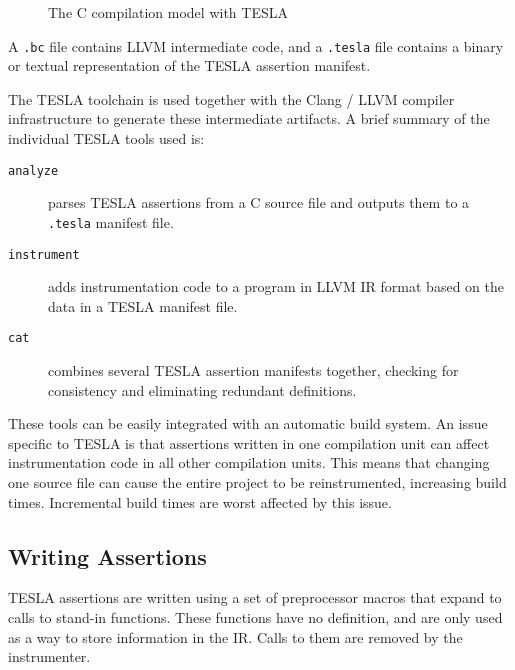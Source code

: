 {\begin{figure}[h]
{
  }
  \caption{The C compilation model with TESLA}
  \label{fig:c-tesla-compilation}
\end{figure}
}

A \texttt{.bc} file contains LLVM intermediate code, and a \texttt{.tesla} file
contains a binary or textual representation of the TESLA assertion manifest.

The TESLA toolchain is used together with the Clang / LLVM compiler
infrastructure to generate these intermediate artifacts. A brief summary of the
individual TESLA tools used is:

\begin{description}
  \item[\texttt{analyze}] parses TESLA assertions from a C source file and
    outputs them to a \texttt{.tesla} manifest file.
  \item[\texttt{instrument}] adds instrumentation code to a program in LLVM IR
    format based on the data in a TESLA manifest file.
  \item[\texttt{cat}] combines several TESLA assertion manifests together,
    checking for consistency and eliminating redundant definitions.
\end{description}

These tools can be easily integrated with an automatic build system. An issue
specific to TESLA is that assertions written in one compilation unit can affect
instrumentation code in all other compilation units. This means that changing
one source file can cause the entire project to be reinstrumented, increasing
build times. Incremental build times are worst affected by this issue.

\subsection{Writing Assertions}

TESLA assertions are written using a set of preprocessor macros that expand to
calls to stand-in functions. These functions have no definition, and are only
used as a way to store information in the IR. Calls to them are removed by the
instrumenter.

